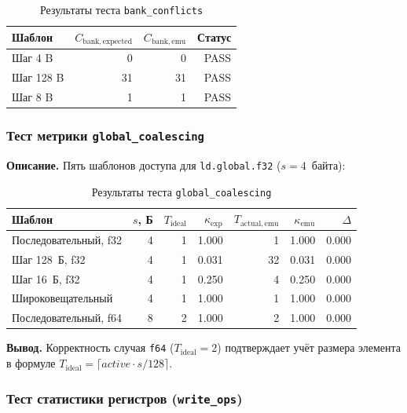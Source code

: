 \begin{table}[h]
  \caption{Результаты теста \texttt{bank\_conflicts}}
  \label{tab:bank_conflicts_test}
  \centering
  \begin{tabular}{lrrr}
    \toprule
    \textbf{Шаблон} & $C_{\mathrm{bank,expected}}$ & $C_{\mathrm{bank,emu}}$ & Статус \\
    \midrule
    Шаг 4 B    & 0  & 0  & PASS \\
    Шаг 128 B  & 31 & 31 & PASS \\
    Шаг 8 B    & 1  & 1  & PASS \\
    \bottomrule
  \end{tabular}
\end{table}

\subsubsection{Тест метрики \texttt{global\_coalescing}}

\textbf{Описание.}
Пять шаблонов доступа для \texttt{ld.global.f32} ($s=4$~байта):

\begin{table}[h]
  \caption{Результаты теста \texttt{global\_coalescing}}
  \label{tab:coalescing_test}
  \centering
  \begin{tabular}{lrrrrrr}
    \toprule
    \textbf{Шаблон} & $s$, Б & $T_{\mathrm{ideal}}$ & $\kappa_{\mathrm{exp}}$ &
    $T_{\mathrm{actual,emu}}$ & $\kappa_{\mathrm{emu}}$ & $\Delta$ \\
    \midrule
    Последовательный, f32 & 4 & 1 & 1.000 & 1  & 1.000 & 0.000 \\
    Шаг 128~Б, f32        & 4 & 1 & 0.031 & 32 & 0.031 & 0.000 \\
    Шаг 16~Б, f32         & 4 & 1 & 0.250 & 4  & 0.250 & 0.000 \\
    Широковещательный     & 4 & 1 & 1.000 & 1  & 1.000 & 0.000 \\
    Последовательный, f64 & 8 & 2 & 1.000 & 2  & 1.000 & 0.000 \\
    \bottomrule
  \end{tabular}
\end{table}

\textbf{Вывод.}
Корректность случая \texttt{f64} ($T_{\mathrm{ideal}} = 2$) подтверждает
учёт размера элемента в формуле $T_{\mathrm{ideal}} = \lceil \mathit{active} \cdot s / 128 \rceil$.

\subsubsection{Тест статистики регистров (\texttt{write\_ops})}

